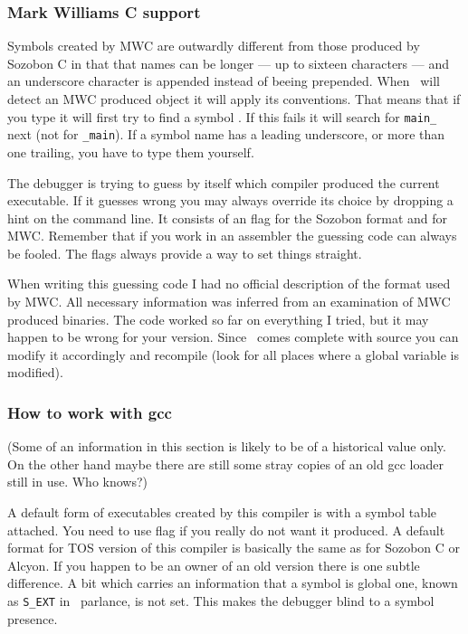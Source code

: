 \subsubsection{Mark Williams C support}

Symbols created by MWC are outwardly different from those produced
by Sozobon C in that that names can be longer  --- up to
sixteen characters --- and an underscore character is appended instead of
beeing prepended.
When \szadb\ will detect an MWC produced object it will apply its
conventions.
That means that if you type  it will first try
to find a symbol .
If this fails it will search for \verb|main_| next  (not for \verb|_main|).
If a symbol name has a leading underscore, or more
than one trailing, you have to type them yourself.

The debugger is trying to guess by itself which compiler produced the
current executable.  If it guesses wrong you may always override its
choice by dropping a hint on the command line.  It consists of an
 flag for the Sozobon format and  for MWC.
Remember that if you work in an assembler the guessing code can always
be fooled.  The flags always provide a way to set things straight.

When writing this guessing code I had no official description
of the format used by MWC.  All necessary information was inferred
from an examination of MWC produced binaries.
The code  worked so far on everything
I tried, but it may happen to be wrong for your version.
Since \szadb\ comes complete with source you can
modify it accordingly and recompile
(look for all places where a global variable  is modified).

\subsubsection{How to work with gcc}

(Some of an information in this section is likely to be of a historical
value only.  On the other hand maybe there are still some stray copies
of an old gcc loader still in use.  Who knows?)

A default form of executables created by this compiler is with a symbol
table attached. You need to use  flag if you really do not want
it produced.  A default format for TOS version of this compiler is
basically the same as for Sozobon C or Alcyon.  If you happen to
be an owner of an old version there is 
one subtle difference.  A bit which carries an information
that a symbol is global one, known as \verb|S_EXT| in \szadb\ parlance,
is not set.  This makes the debugger blind to a symbol presence.

